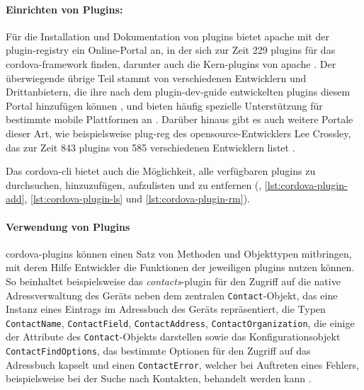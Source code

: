 {\paragraph{Einrichten von Plugins:}

Für die Installation und Dokumentation von \glspl{plugin} bietet \gls{apache} mit der \gls{plugin-registry} ein Online-Portal an, in der sich zur Zeit 229 \glspl{plugin} für das \gls{cordova}-\gls{framework} finden, darunter auch die \og Kern-\glspl{plugin} von \gls{apache} \cite{Cordova_Docs_Plugin_APIs}. Der überwiegende übrige Teil stammt von verschiedenen Entwicklern und Drittanbietern, die ihre nach dem \gls{plugin-dev-guide} entwickelten \glspl{plugin} diesem Portal hinzufügen können \cite{Cordova_Plugin_Development_Guide}, und bieten häufig spezielle Unterstützung für bestimmte mobile Plattformen an \cite{Cordova_Plugin_Registry_viewAll}.
Darüber hinaus gibt es auch weitere Portale dieser Art, wie beispielsweise \gls{plug-reg} des \gls{opensource}-Entwicklers Lee Crossley, das zur Zeit 843 \glspl{plugin} von 585 verschiedenen Entwicklern listet \cite{PlugReg}.

Das \gls{cordova}-\gls{cli} bietet auch die Möglichkeit, alle verfügbaren \glspl{plugin} zu durchsuchen, hinzuzufügen, aufzulisten und zu entfernen (, \ref{lst:cordova-plugin-add}, \ref{lst:cordova-plugin-ls} und \ref{lst:cordova-plugin-rm}).






\paragraph{Verwendung von Plugins}	\label{sec:cordova-plugins-verwendung}

\gls{cordova}-\glspl{plugin} können einen Satz von Methoden und Objekttypen mitbringen, mit deren Hilfe Entwickler die Funktionen der jeweiligen \glspl{plugin} nutzen können.
So beinhaltet beispielsweise das \emph{contacts}-\gls{plugin} für den Zugriff auf die native Adressverwaltung des Geräts neben dem zentralen \lstinline|Contact|-Objekt, das eine Instanz eines Eintrags im Adressbuch des Geräts repräsentiert, die Typen \mbox{\lstinline|ContactName|,} \mbox{\lstinline|ContactField|,} \mbox{\lstinline|ContactAddress|,} \mbox{\lstinline|ContactOrganization|,} die einige der Attribute des \lstinline|Contact|-Objekts darstellen sowie das Konfigurationsobjekt \mbox{\lstinline|ContactFindOptions|,} das bestimmte Optionen für den Zugriff auf das Adressbuch kapselt und einen \mbox{\lstinline|ContactError|,} welcher bei Auftreten eines Fehlers, beispielsweise bei der Suche nach Kontakten, behandelt werden kann \cite{Cordova_Plugin_Registry_Contacts}.

}
